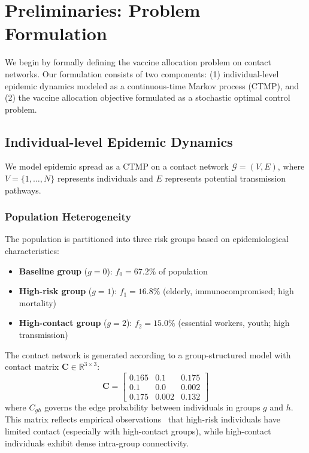 \section{Preliminaries: Problem Formulation}
\label{sec:preliminaries}

We begin by formally defining the vaccine allocation problem on contact networks.
Our formulation consists of two components: (1) individual-level epidemic dynamics
modeled as a continuous-time Markov process (CTMP), and (2) the vaccine allocation
objective formulated as a stochastic optimal control problem.

\subsection{Individual-level Epidemic Dynamics}
\label{sec:ctmp_dynamics}

We model epidemic spread as a CTMP on a contact network $\mathcal{G} = (V, E)$,
where $V = \{1, \ldots, N\}$ represents individuals and $E$ represents potential
transmission pathways.

\subsubsection{Population Heterogeneity}

The population is partitioned into three risk groups based on epidemiological characteristics:
\begin{itemize}
    \item \textbf{Baseline group} ($g=0$): $f_0 = 67.2\%$ of population
    \item \textbf{High-risk group} ($g=1$): $f_1 = 16.8\%$ (elderly, immunocompromised; high mortality)
    \item \textbf{High-contact group} ($g=2$): $f_2 = 15.0\%$ (essential workers, youth; high transmission)
\end{itemize}

The contact network is generated according to a group-structured model with contact matrix
$\mathbf{C} \in \mathbb{R}^{3 \times 3}$:
\begin{equation}
\mathbf{C} = \begin{bmatrix}
0.165 & 0.1 & 0.175 \\
0.1 & 0.0 & 0.002 \\
0.175 & 0.002 & 0.132
\end{bmatrix}
\end{equation}
where $C_{gh}$ governs the edge probability between individuals in groups $g$ and $h$.
This matrix reflects empirical observations~\citep{mistry2021inferring} that high-risk
individuals have limited contact (especially with high-contact groups), while high-contact
individuals exhibit dense intra-group connectivity.

